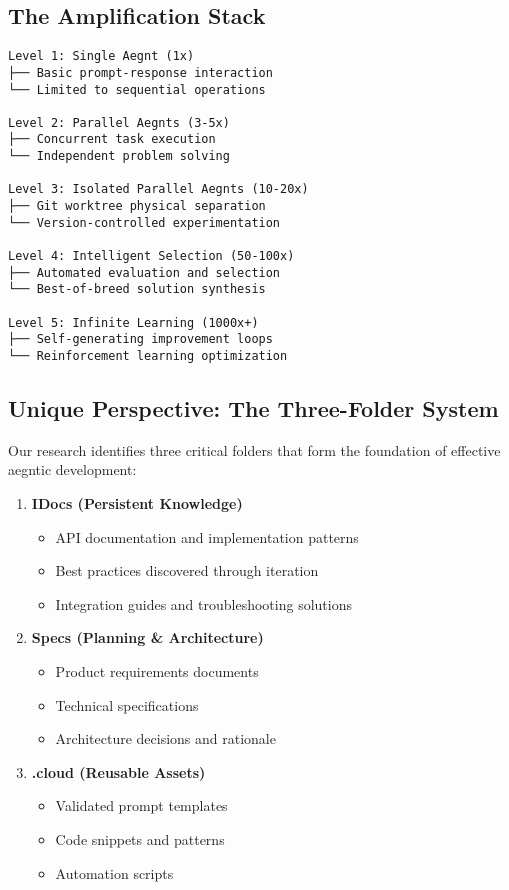 \documentclass[11pt]{article}
\begin{document}
\subsection{The Amplification Stack}

\begin{verbatim}
Level 1: Single Aegnt (1x)
├── Basic prompt-response interaction
└── Limited to sequential operations

Level 2: Parallel Aegnts (3-5x)
├── Concurrent task execution
└── Independent problem solving

Level 3: Isolated Parallel Aegnts (10-20x)
├── Git worktree physical separation
└── Version-controlled experimentation

Level 4: Intelligent Selection (50-100x)
├── Automated evaluation and selection
└── Best-of-breed solution synthesis

Level 5: Infinite Learning (1000x+)
├── Self-generating improvement loops
└── Reinforcement learning optimization
\end{verbatim}

\subsection{Unique Perspective: The Three-Folder System}

Our research identifies three critical folders that form the foundation of effective aegntic development:

\begin{enumerate}
\item \textbf{IDocs (Persistent Knowledge)}
\begin{itemize}[noitemsep]
\item API documentation and implementation patterns
\item Best practices discovered through iteration
\item Integration guides and troubleshooting solutions
\end{itemize}

\item \textbf{Specs (Planning \& Architecture)}
\begin{itemize}[noitemsep]
\item Product requirements documents
\item Technical specifications
\item Architecture decisions and rationale
\end{itemize}

\item \textbf{.cloud (Reusable Assets)}
\begin{itemize}[noitemsep]
\item Validated prompt templates
\item Code snippets and patterns
\item Automation scripts
\end{itemize}
\end{enumerate}
\end{document}
